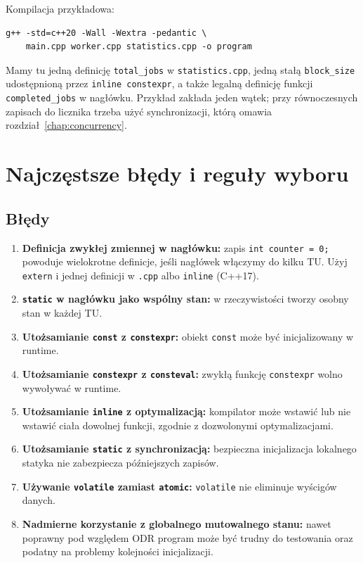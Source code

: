 Kompilacja przykładowa:
\begin{lstlisting}
g++ -std=c++20 -Wall -Wextra -pedantic \
    main.cpp worker.cpp statistics.cpp -o program
\end{lstlisting}

Mamy tu jedną definicję \texttt{total\_jobs} w \texttt{statistics.cpp},
jedną stałą \texttt{block\_size} udostępnioną przez
\texttt{inline constexpr}, a także legalną definicję funkcji
\texttt{completed\_jobs} w nagłówku. Przykład zakłada jeden wątek;
przy równoczesnych zapisach do licznika trzeba użyć synchronizacji,
którą omawia rozdział~\ref{chap:concurrency}.

\section{Najczęstsze błędy i reguły wyboru}

\subsection{Błędy}

\begin{enumerate}
    \item \textbf{Definicja zwykłej zmiennej w nagłówku:}
    zapis \texttt{int counter = 0;} powoduje wielokrotne definicje,
    jeśli nagłówek włączymy do kilku TU. Użyj \texttt{extern}
    i jednej definicji w \texttt{.cpp} albo \texttt{inline} (C++17).
    \item \textbf{\texttt{static} w nagłówku jako wspólny stan:}
    w rzeczywistości tworzy osobny stan w każdej TU.
    \item \textbf{Utożsamianie \texttt{const} z \texttt{constexpr}:}
    obiekt \texttt{const} może być inicjalizowany w runtime.
    \item \textbf{Utożsamianie \texttt{constexpr} z \texttt{consteval}:}
    zwykłą funkcję \texttt{constexpr} wolno wywoływać w runtime.
    \item \textbf{Utożsamianie \texttt{inline} z optymalizacją:}
    kompilator może wstawić lub nie wstawić ciała dowolnej funkcji,
    zgodnie z dozwolonymi optymalizacjami.
    \item \textbf{Utożsamianie \texttt{static} z synchronizacją:}
    bezpieczna inicjalizacja lokalnego statyka nie zabezpiecza
    późniejszych zapisów.
    \item \textbf{Używanie \texttt{volatile} zamiast \texttt{atomic}:}
    \texttt{volatile} nie eliminuje wyścigów danych.
    \item \textbf{Nadmierne korzystanie z globalnego mutowalnego stanu:}
    nawet poprawny pod względem ODR program może być trudny
    do testowania oraz podatny na problemy kolejności inicjalizacji.
\end{enumerate}

